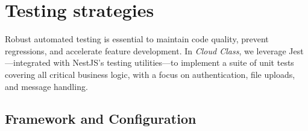 



\section{Testing strategies}

Robust automated testing is essential to maintain code quality, prevent regressions, and accelerate feature development.  In \emph{Cloud Class}, we leverage Jest—integrated with NestJS’s testing utilities—to implement a suite of unit tests covering all critical business logic, with a focus on authentication, file uploads, and message handling.

\subsection{Framework and Configuration}

